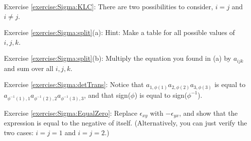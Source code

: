 \noindent Exercise \ref{exercise:Sigma:KLC}: There are two possibilities to consider, $i=j$ and $i \neq j$.

\noindent Exercise \ref{exercise:Sigma:split}(a): Hint: Make a table for all possible values of $i,j,k$.

\noindent Exercise \ref{exercise:Sigma:split}(b): Multiply the equation you found in (a) by $a_{ijk}$ and sum over all $i,j,k$.


\noindent Exercise \ref{exercise:Sigma:detTrans}: Notice that $a_{1, \phi(1)} a_{2, \phi(2)} a_{3, \phi(3)}$ is equal to $a_{\phi^{-1}(1), 1} a_{\phi^{-1}(2), 2} a_{\phi^{-1}(3), 3}$, and that sign($\phi$) is equal to sign($\phi^{-1}$). 

\noindent Exercise \ref{exercise:Sigma:EqualZero}: Replace $\epsilon_{xy}$ with $-\epsilon_{yx}$, and show that the expression is equal to the negative of itself. (Alternatively, you can just verify the two cases:  $i=j=1$ and $i=j=2$.)


